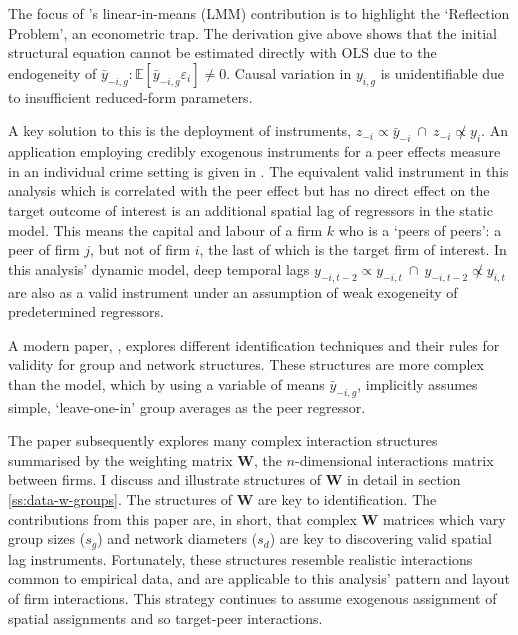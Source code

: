 The focus of \cite{Manski1993}'s linear-in-means (LMM) contribution is to highlight the `Reflection Problem',
an econometric trap.
The derivation give above shows that the initial structural equation
cannot be estimated directly with OLS due to the endogeneity of $\bar y_{-i,g}: \mathbb E[\bar y_{-i,g}\varepsilon_i]\neq 0$.
Causal variation in $y_{i,g}$ is unidentifiable due to insufficient reduced-form parameters.
\par
A key solution to this is the deployment of instruments, $z_{-i}\propto \bar y_{-i}\ \cap\ z_{-i} \not\propto y_{i}$.
An application employing credibly exogenous instruments for a peer effects measure in an individual crime setting
is given in \cite{dustmann-landerso2024:gangs-babyfathers}.
The equivalent valid instrument in this analysis which is correlated with the peer effect
but has no direct effect on the target outcome of interest
is an additional spatial lag of  regressors in the static model.
This means the capital and labour of a firm $k$ who is a `peers of peers': a peer of firm $j$,
but not of firm $i$, the last of which is the target firm of interest.
In this analysis' dynamic model, deep temporal lags $y_{-i,t-2}\propto y_{-i,t}\ \cap\ y_{-i,t-2}\not\propto y_{i, t}$
are also as a valid instrument under an assumption of weak exogeneity of predetermined regressors.
\par
A modern paper, \cite{Bramoulle2009}, explores different identification techniques and their rules for validity
for group and network structures. These structures are more complex than the \cite{Manski1993} model,
which by using a variable of means $\bar y_{-i,g}$, implicitly assumes simple, `leave-one-in' group averages
as the peer  regressor.
\par
The paper subsequently explores many complex interaction structures summarised by the weighting matrix $\mathbf W$,
the $n$-dimensional interactions matrix between firms.
I discuss and illustrate structures of $\mathbf W$ in detail in section \ref{ss:data-w-groups}.
The structures of $\mathbf W$ are key to identification.
The contributions from this paper are, in short, that complex $\mathbf W$ matrices which vary group sizes ($s_g$)
and network diameters ($s_d$) are key to discovering valid spatial lag instruments.
Fortunately, these structures resemble realistic interactions common to empirical data,
and are applicable to this analysis' pattern and layout of firm interactions.
This strategy continues to assume exogenous assignment of spatial assignments
and so target-peer interactions.

